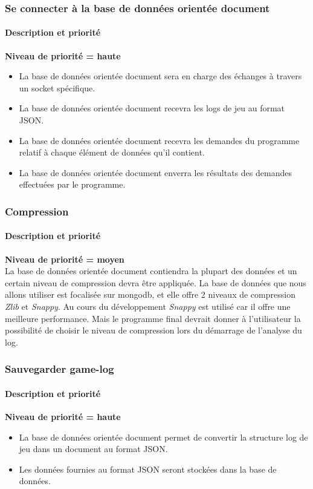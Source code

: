 \subsubsection{Se connecter à la base de données orientée document }
\paragraph*{Description et priorité}
\textbf{Niveau de priorité = haute}\\
\begin{itemize}
\item La base de données orientée document sera en charge des échanges à travers un socket spécifique.
\item La base de données orientée document recevra les logs de jeu au format JSON.
\item La base de données orientée document recevra les demandes du programme relatif à chaque élément de données qu'il contient.
\item La base de données orientée document enverra les résultats des demandes effectuées par le programme.
\end{itemize}


\subsubsection{Compression}
\paragraph*{Description et priorité}
\textbf{Niveau de priorité = moyen}\\

La base de données orientée document contiendra la plupart des données et un certain niveau de compression devra être appliquée.
La base de données que nous allons utiliser est focalisée sur mongodb, et elle offre 2 niveaux de compression \textit{Zlib} et \textit{Snappy}.
Au cours du développement \textit{Snappy} est utilisé car il offre une meilleure performance.
Mais le programme final devrait donner à l'utilisateur la possibilité de choisir le niveau de compression lors du démarrage de l'analyse du log.

\subsubsection{Sauvegarder game-log}

\paragraph*{Description et priorité}
\textbf{Niveau de priorité = haute}\\
\begin{itemize}
\item La base de données orientée document permet de convertir la structure log de jeu dans un document au format JSON.
\item Les données fournies au format JSON seront stockées dans la base de données.
\end{itemize}
